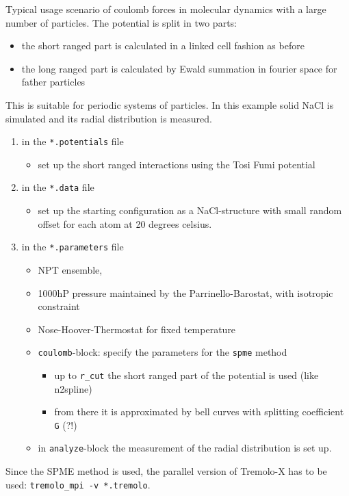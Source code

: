 \documentclass[11pt]{article}
\begin{document}
Typical usage scenario of coulomb forces in molecular dynamics with a large number of particles. 
The potential is split in two parts: 
\begin{itemize}
\item the short ranged part is calculated in a linked cell fashion as before
\item the long ranged part is calculated by Ewald summation in fourier space for father particles
\end{itemize}
This is suitable for periodic systems of particles. 
In this example solid NaCl is simulated and its radial distribution is measured. 

\begin{enumerate}
\item in the \texttt{*.potentials} file

\begin{itemize}
\item set up the short ranged interactions using the Tosi Fumi potential
\end{itemize}

\item in the \texttt{*.data} file

\begin{itemize}
\item set up the starting configuration as a NaCl-structure with small random offset for each atom at 20 degrees celsius.
\end{itemize}

\item in the \texttt{*.parameters} file

\begin{itemize}
\item NPT ensemble,
\item 1000hP pressure maintained by the Parrinello-Barostat, with isotropic constraint
\item Nose-Hoover-Thermostat for fixed temperature
\item \texttt{coulomb}-block: specify the parameters for the \texttt{spme} method

\begin{itemize}
\item up to \texttt{r\_cut} the short ranged part of the potential is used (like n2spline)
\item from there it is approximated by bell curves with splitting coefficient \texttt{G} (?!)
\end{itemize}

\item in \texttt{analyze}-block the measurement of the radial distribution is set up.
\end{itemize}

\end{enumerate}
Since the SPME method is used, the parallel version of Tremolo-X has to be used: \texttt{tremolo\_mpi -v *.tremolo}. 
\end{document}
